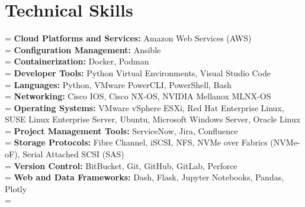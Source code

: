 \documentclass[10pt]{article}       %
\begin{document}
\vspace{-10pt}

\section*{Technical Skills}
\newlength{\mylength}
\setlength{\mylength}{9.25em}

\hangindent=\mylength
\textbf{Cloud Platforms and Services:} Amazon Web Services (AWS) \\
\hangindent=\mylength
\textbf{Configuration Management:} Ansible \\
\hangindent=\mylength
\textbf{Containerization:} Docker, Podman \\
\hangindent=\mylength
\textbf{Developer Tools:} Python Virtual Environments, Visual Studio Code \\
\hangindent=\mylength
\textbf{Languages:} Python, VMware PowerCLI, PowerShell, Bash \\
\hangindent=\mylength
\textbf{Networking:} Cisco IOS, Cisco NX-OS, NVIDIA Mellanox MLNX-OS \\
\hangindent=\mylength
\textbf{Operating Systems:} VMware vSphere ESXi, Red Hat Enterprise Linux, SUSE Linux Enterprise Server, Ubuntu, Microsoft Windows Server, Oracle Linux \\
\hangindent=\mylength
\textbf{Project Management Tools:} ServiceNow, Jira, Confluence \\
\hangindent=\mylength
\textbf{Storage Protocols:} Fibre Channel, iSCSI, NFS, NVMe over Fabrics (NVMe-oF), Serial Attached SCSI (SAS) \\
\hangindent=\mylength
\textbf{Version Control:} BitBucket, Git, GitHub, GitLab, Perforce \\
\hangindent=\mylength
\textbf{Web and Data Frameworks:} Dash, Flask, Jupyter Notebooks, Pandas, Plotly \\
\hangindent=\mylength
\end{document}

